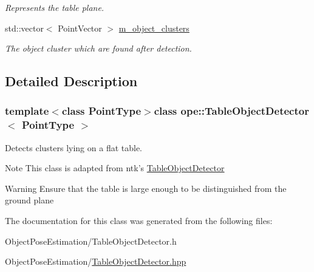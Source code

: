 \begin{DoxyCompactItemize}
\begin{DoxyCompactList}\small\item\em Represents the table plane. \end{DoxyCompactList}\item 
\hypertarget{classope_1_1_table_object_detector_a518a0f080f217de7f553e25ba142174f}{std\-::vector$<$ Point\-Vector $>$ \hyperlink{classope_1_1_table_object_detector_a518a0f080f217de7f553e25ba142174f}{m\-\_\-object\-\_\-clusters}}\label{classope_1_1_table_object_detector_a518a0f080f217de7f553e25ba142174f}

\begin{DoxyCompactList}\small\item\em The object cluster which are found after detection. \end{DoxyCompactList}\end{DoxyCompactItemize}


\subsection{Detailed Description}
\subsubsection*{template$<$class Point\-Type$>$class ope\-::\-Table\-Object\-Detector$<$ Point\-Type $>$}

Detects clusters lying on a flat table. 

\begin{DoxyNote}{Note}
This class is adapted from ntk's \hyperlink{classope_1_1_table_object_detector}{Table\-Object\-Detector} 
\end{DoxyNote}
\begin{DoxyWarning}{Warning}
Ensure that the table is large enough to be distinguished from the ground plane 
\end{DoxyWarning}


The documentation for this class was generated from the following files\-:\begin{DoxyCompactItemize}
\item 
Object\-Pose\-Estimation/Table\-Object\-Detector.\-h\item 
Object\-Pose\-Estimation/\hyperlink{_table_object_detector_8hpp}{Table\-Object\-Detector.\-hpp}\end{DoxyCompactItemize}
